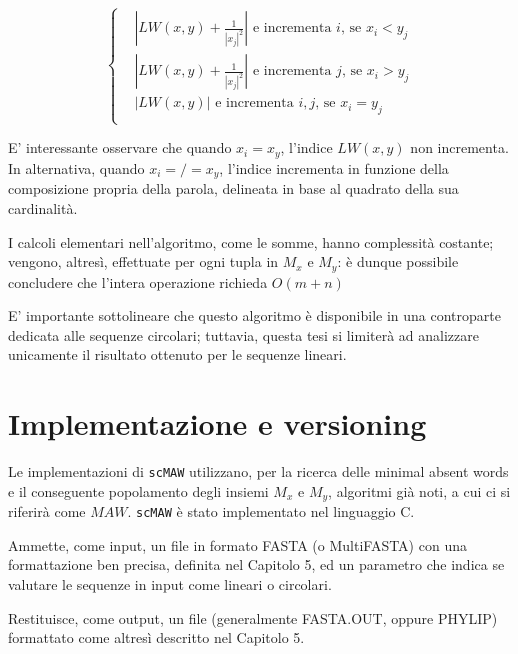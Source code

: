 \begin{equation*}
  \left\{
    \begin{aligned}
      & {\left|
        LW(x,y) + \frac{1}{|x_j |^2}
      \right|} \text{ e incrementa } i\text{, se } x_i < y_j \\
      & {\left|
        LW(x,y) + \frac{1}{|x_j |^2}
      \right|} \text{ e incrementa } j\text{, se } x_i > y_j \\
      & {\left|
        LW(x,y)
      \right|} \text{ e incrementa } i,j\text{, se } x_i = y_j \\
    \end{aligned}
  \right.
\end{equation*}

E' interessante osservare che quando $x_i = x_y$, l'indice $LW(x,y)$ non incrementa. In alternativa, quando $x_i =/= x_y$, l'indice incrementa in funzione della composizione propria della parola, delineata in base al quadrato della sua cardinalità.

\vspace{3mm}

I calcoli elementari nell'algoritmo, come le somme, hanno complessità costante; vengono, altresì, effettuate per ogni tupla in $M_x$ e $M_y$: è dunque possibile concludere che l'intera operazione richieda $O(m+n)$

\vspace{3mm}

E' importante sottolineare che questo algoritmo è disponibile in una controparte dedicata alle sequenze circolari; tuttavia, questa tesi si limiterà ad analizzare unicamente il risultato ottenuto per le sequenze lineari.

\section{Implementazione e versioning}

Le implementazioni di \verb|scMAW| utilizzano, per la ricerca delle minimal absent words e il conseguente popolamento degli insiemi $M_x$ e $M_y$, algoritmi già noti, a cui ci si riferirà come $MAW$. \verb|scMAW| è stato implementato nel linguaggio C. 

Ammette, come input, un file in formato FASTA (o MultiFASTA) con una formattazione ben precisa, definita nel Capitolo 5, ed un parametro che indica se valutare le sequenze in input come lineari o circolari. 

Restituisce, come output, un file (generalmente FASTA.OUT, oppure PHYLIP) formattato come altresì descritto nel Capitolo 5. 

